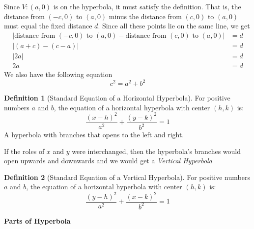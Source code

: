 \documentclass[a4paper]{article}
\theoremstyle{definition}
\newtheorem*{defi}{Definition}
\begin{document}
Since $V:(a,0)$ is on the hyperbola, it must satisfy the definition. That is,
the distance from $(-c,0)$ to $(a,0)$ minus the distance from $(c,0)$ to $(a,0)$
must equal the fixed distance $d$. Since all these points lie on the same line,
we get
\begin{align*}
     \left \lvert \text{distance from $(-c,0)$ to $(a,0)$} -
     \text{distance from $(c,0)$ to $(a,0)$} \right \rvert &= d \\[1.25ex]
     \left \lvert (a+c) - (c-a) \right \rvert &= d \\[1.25ex]
     \left \lvert 2a \right \rvert &= d \\[1.25ex]
     2a &= d 
\end{align*}
We also have the following equation
\begin{equation*}
      c^2 = a^2 + b^2
\end{equation*}
\begin{defi}[Standard Equation of a Horizontal Hyperbola]
      For positive numbers $a$ and $b$, the equation of a horizontal hyperbola
       with center $(h,k)$ is:
       \begin{equation*}
             \dfrac{(x-h)^2}{a^2}+\dfrac{(y-k)^2}{b^2} = 1
       \end{equation*}
       A hyperbola with branches that opens to the left and right.
\end{defi}
If the roles of $x$ and $y$ were interchanged, then the hyperbola’s branches
would open upwards and downwards and we would get a 
\emph{Vertical Hyperbola}
\begin{defi}[Standard Equation of a Vertical Hyperbola]
     For positive numbers $a$ and $b$, the equation of a horizontal hyperbola
     with center $(h,k)$ is:
     \begin{equation*}
          \dfrac{(y-h)^2}{a^2}+\dfrac{(x-k)^2}{b^2} = 1
     \end{equation*}
\end{defi}
\textbf{Parts of Hyperbola}
\end{document}
